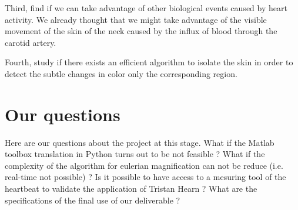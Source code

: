 \documentclass[a4paper]{article}
\begin{document}
Third, find if we can take advantage of other biological events caused by heart activity. We already thought that we might take advantage of the visible movement of the skin of the neck caused by the influx of blood through the carotid artery.

Fourth, study if there exists an efficient algorithm to isolate the skin in order to detect the subtle changes in color only the corresponding region.


\section*{Our questions}

Here are our questions about the project at this stage. What if the Matlab toolbox translation in Python turns out to be not feasible ? What if the complexity of the algorithm for eulerian magnification can not be reduce (i.e. real-time not possible) ? Is it possible to have access to a mesuring tool of the heartbeat to validate the application of Tristan Hearn ? What are the specifications of the final use of our deliverable ?




\end{document}
